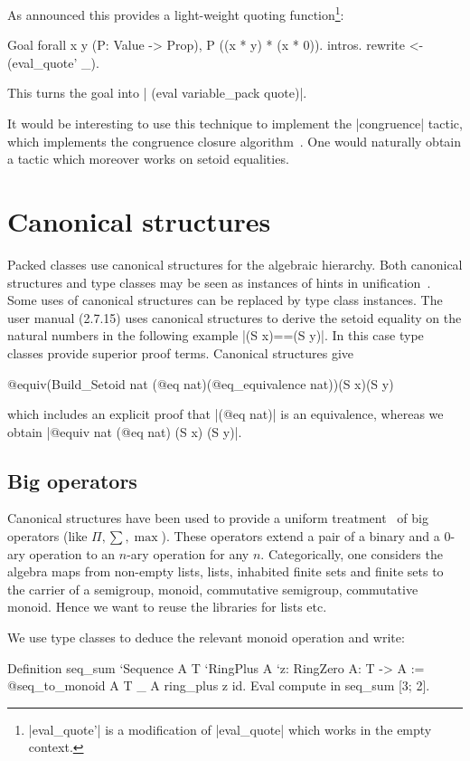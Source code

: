 \documentclass[a4paper,10pt, runningheads]{llncs}
\begin{document}
\noindent As announced this provides a light-weight quoting function\footnote{|eval_quote'| is a
modification of |eval_quote| which works in the empty context.}:
\begin{code}
Goal forall x y (P: Value -> Prop), P ((x * y) * (x * 0)).
  intros. rewrite <- (eval_quote' _).
\end{code}
This turns the goal into | (eval variable_pack quote)|.

It would be interesting to use this technique to implement the |congruence| tactic, which implements
the congruence closure algorithm~\cite{corbineau2007deciding}. One would naturally obtain a tactic
which moreover works on setoid equalities.

\section{Canonical structures}\label{canonical}
Packed classes use canonical structures for the algebraic hierarchy. Both canonical structures and
type classes may be seen as instances of hints in unification~\cite{Hints}. Some uses of canonical
structures can be replaced by type class instances. The user manual (2.7.15) uses canonical
structures to derive the setoid equality on the natural
numbers in the following example |(S x)==(S y)|. In this case type classes provide superior proof
terms. Canonical structures give
\begin{code}
@equiv(Build_Setoid nat (@eq nat)(@eq_equivalence nat))(S x)(S y)
\end{code}
which includes an explicit proof that |(@eq nat)| is an equivalence,
whereas we obtain |@equiv nat (@eq nat) (S x) (S y)|.

\subsection{Big operators}
Canonical structures have been used to provide a uniform treatment~\cite{bertot2008canonical} of big
operators (like $\Pi,\sum, \max$). These operators extend a pair of a binary and a 0-ary operation
to an $n$-ary operation for any $n$. Categorically, one considers the algebra maps from non-empty
lists, lists, inhabited finite sets and finite sets to the carrier of a semigroup, monoid,
commutative semigroup, commutative monoid. Hence we want to reuse the libraries for lists etc.

We use type classes to deduce the relevant monoid operation and write:
\begin{code}
Definition seq_sum
  `{Sequence A T} `{RingPlus A} `{z: RingZero A}: T -> A
  := @seq_to_monoid A T _ A ring_plus z id.
  Eval compute in seq_sum [3; 2].
\end{code}
\end{document}
